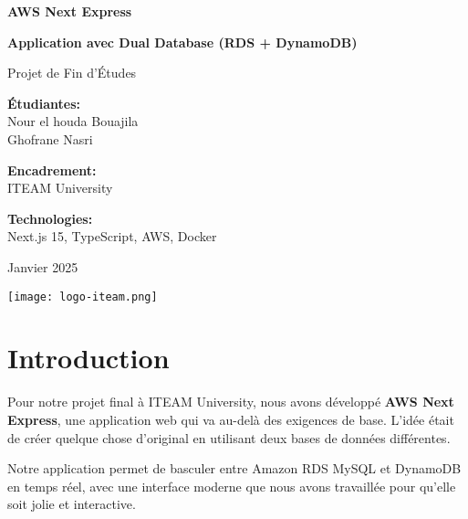 \documentclass[12pt,a4paper]{report}
\begin{document}
\begin{titlepage}
    \centering
    \vspace*{2cm}
    
    {\huge\bfseries AWS Next Express\par}
    \vspace{0.5cm}
    {\large\bfseries Application avec Dual Database (RDS + DynamoDB)\par}
    \vspace{2cm}
    
    {\Large Projet de Fin d'Études\par}
    \vspace{1cm}
    
    {\large
    \textbf{Étudiantes:}\\
    Nour el houda Bouajila\\
    Ghofrane Nasri\par}
    \vspace{1cm}
    
    {\large
    \textbf{Encadrement:}\\
    ITEAM University\par}
    \vspace{2cm}
    
    {\large
    \textbf{Technologies:}\\
    Next.js 15, TypeScript, AWS, Docker\par}
    \vspace{1cm}
    
    {\large Janvier 2025\par}
    
    \vfill
    
    \texttt{[image: logo-iteam.png]}
    
\end{titlepage}

\tableofcontents
\newpage

\chapter{Introduction}

Pour notre projet final à ITEAM University, nous avons développé \textbf{AWS Next Express}, une application web qui va au-delà des exigences de base. L'idée était de créer quelque chose d'original en utilisant deux bases de données différentes.

Notre application permet de basculer entre Amazon RDS MySQL et DynamoDB en temps réel, avec une interface moderne que nous avons travaillée pour qu'elle soit jolie et interactive.
\end{document}
